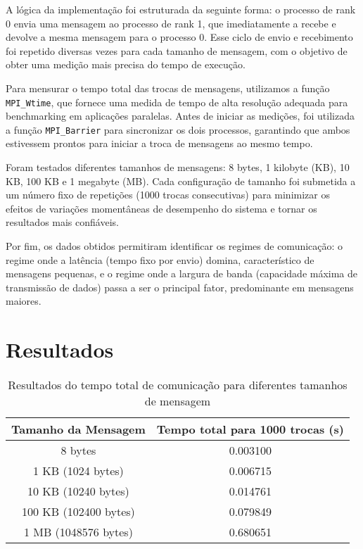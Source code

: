 \documentclass[a4paper, 12pt]{article}
\begin{document}
	\hspace{0.62cm}A lógica da implementação foi estruturada da seguinte forma: o processo de rank 0 envia uma mensagem ao processo de rank 1, que imediatamente a recebe e devolve a mesma mensagem para o processo 0. Esse ciclo de envio e recebimento foi repetido diversas vezes para cada tamanho de mensagem, com o objetivo de obter uma medição mais precisa do tempo de execução.
	
	\hspace{0.62cm}Para mensurar o tempo total das trocas de mensagens, utilizamos a função \texttt{MPI\_Wtime}, que fornece uma medida de tempo de alta resolução adequada para benchmarking em aplicações paralelas. Antes de iniciar as medições, foi utilizada a função \texttt{MPI\_Barrier} para sincronizar os dois processos, garantindo que ambos estivessem prontos para iniciar a troca de mensagens ao mesmo tempo.
	
	\hspace{0.62cm}Foram testados diferentes tamanhos de mensagens: 8 bytes, 1 kilobyte (KB), 10 KB, 100 KB e 1 megabyte (MB). Cada configuração de tamanho foi submetida a um número fixo de repetições (1000 trocas consecutivas) para minimizar os efeitos de variações momentâneas de desempenho do sistema e tornar os resultados mais confiáveis.
	
	\hspace{0.62cm}Por fim, os dados obtidos permitiram identificar os regimes de comunicação: o regime onde a latência (tempo fixo por envio) domina, característico de mensagens pequenas, e o regime onde a largura de banda (capacidade máxima de transmissão de dados) passa a ser o principal fator, predominante em mensagens maiores.
	
	\section{Resultados}
	
	\begin{table}[H]
		\centering
		\begin{tabular}{|c|c|}
			\hline
			\textbf{Tamanho da Mensagem} & \textbf{Tempo total para 1000 trocas (s)} \\ \hline
			8 bytes                     & 0.003100                                 \\ \hline
			1 KB (1024 bytes)           & 0.006715                                 \\ \hline
			10 KB (10240 bytes)         & 0.014761                                 \\ \hline
			100 KB (102400 bytes)       & 0.079849                                 \\ \hline
			1 MB (1048576 bytes)        & 0.680651                                 \\ \hline
		\end{tabular}
		\caption{Resultados do tempo total de comunicação para diferentes tamanhos de mensagem}
		\label{tab:resultados}
	\end{table}
	
\end{document}
